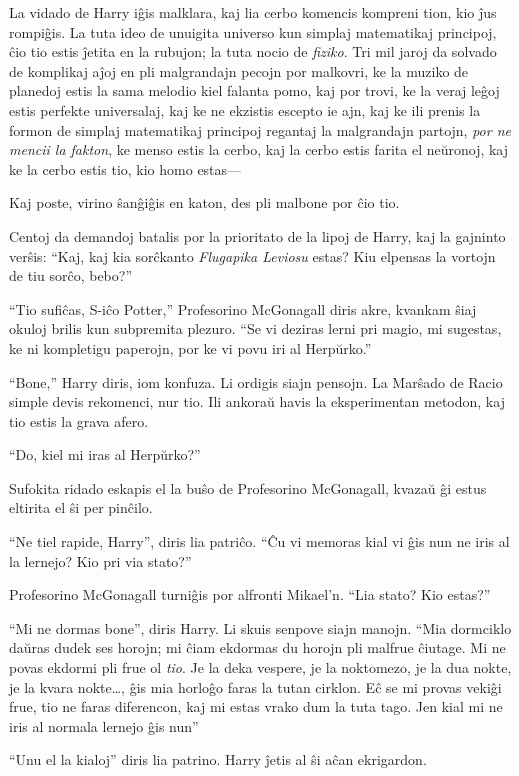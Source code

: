 La vidado de Harry iĝis malklara, kaj lia cerbo komencis kompreni tion, kio ĵus
rompiĝis. La tuta ideo de unuigita universo kun simplaj matematikaj principoj,
ĉio tio estis ĵetita en la rubujon; la tuta nocio de \emph{fiziko}. Tri mil
jaroj da solvado de komplikaj aĵoj en pli malgrandajn pecojn por malkovri, ke la
muziko de planedoj estis la sama melodio kiel falanta pomo, kaj por trovi, ke la
veraj leĝoj estis perfekte universalaj, kaj ke ne ekzistis escepto ie ajn, kaj
ke ili prenis la formon de simplaj matematikaj principoj regantaj la malgrandajn
partojn, \emph{por ne mencii la fakton}, ke menso estis la cerbo, kaj la cerbo
estis farita el neŭronoj, kaj ke la cerbo estis tio, kio homo estas—

Kaj poste, virino ŝanĝiĝis en katon, des pli malbone por ĉio tio.

Centoj da demandoj batalis por la prioritato de la lipoj de Harry, kaj la
gajninto verŝis: ``Kaj, kaj kia sorĉkanto \emph{Flugapika Leviosu} estas? Kiu
elpensas la vortojn de tiu sorĉo, bebo?''

``Tio sufiĉas, S-iĉo Potter,'' Profesorino McGonagall diris akre, kvankam ŝiaj
okuloj brilis kun subpremita plezuro. ``Se vi deziras lerni pri magio, mi
sugestas, ke ni kompletigu paperojn, por ke vi povu iri al Herpŭrko.''

``Bone,'' Harry diris, iom konfuza. Li ordigis siajn pensojn. La Marŝado de
Racio simple devis rekomenci, nur tio. Ili ankoraŭ havis la eksperimentan
metodon, kaj tio estis la grava afero.

``Do, kiel mi iras al Herpŭrko?''

Sufokita ridado eskapis el la buŝo de Profesorino McGonagall, kvazaŭ ĝi estus
eltirita el ŝi per pinĉilo.

``Ne tiel rapide, Harry'', diris lia patriĉo. ``Ĉu vi memoras kial vi ĝis nun ne
iris al la lernejo? Kio pri via stato?''

Profesorino McGonagall turniĝis por alfronti Mikael'n. ``Lia stato? Kio estas?''

``Mi ne dormas bone'', diris Harry. Li skuis senpove siajn manojn. ``Mia
dormciklo daŭras dudek ses horojn; mi ĉiam ekdormas du horojn pli malfrue
ĉiutage. Mi ne povas ekdormi pli frue ol \emph{tio}. Je la deka vespere, je la
noktomezo, je la dua nokte, je la kvara nokte\ldots{}, ĝis mia horloĝo faras la
tutan cirklon. Eĉ se mi provas vekiĝi frue, tio ne faras diferencon, kaj mi
estas vrako dum la tuta tago. Jen kial mi ne iris al normala lernejo ĝis nun''

``Unu el la kialoj'' diris lia patrino. Harry ĵetis al ŝi aĉan ekrigardon.

